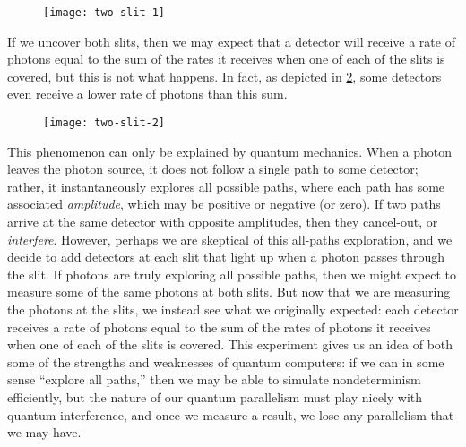 \documentclass[12pt]{article}
\begin{document}
\begin{figure}[H]
  \texttt{[image: two-slit-1]}
  \caption{\cite[p. 203]{AB09}}
  \label{fig:two-slit-1}
\end{figure}

If we uncover both slits, then we may expect that a detector will receive a rate
of photons equal to the sum of the rates it receives when one of each of the
slits is covered, but this is not what happens. In fact, as depicted in
\cref{fig:two-slit-2}, some detectors even receive a lower rate of photons than
this sum.

\begin{figure}[H]
  \texttt{[image: two-slit-2]}
  \caption{\cite[p. 203]{AB09}}
  \label{fig:two-slit-2}
\end{figure}

This phenomenon can only be explained by quantum mechanics. When a photon leaves
the photon source, it does not follow a single path to some detector; rather, it
instantaneously explores all possible paths, where each path has some associated
\emph{amplitude}, which may be positive or negative (or zero). If two paths
arrive at the same detector with opposite amplitudes, then they cancel-out, or
\emph{interfere}. However, perhaps we are skeptical of this all-paths
exploration, and we decide to add detectors at each slit that light up when a
photon passes through the slit. If photons are truly exploring all possible
paths, then we might expect to measure some of the same photons at both slits.
But now that we are measuring the photons at the slits, we instead see what we
originally expected: each detector receives a rate of photons equal to the
sum of the rates of photons it receives when one of each of the slits is
covered. This experiment gives us an idea of both some of the strengths and
weaknesses of quantum computers: if we can in some sense ``explore all paths,''
then we may be able to simulate nondeterminism efficiently, but the nature of
our quantum parallelism must play nicely with quantum interference, and once we
measure a result, we lose any parallelism that we may have.
\end{document}
